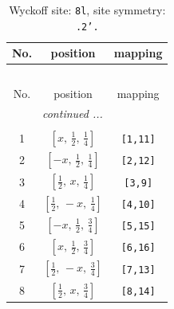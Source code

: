 \documentclass[fleqn,8pt]{jsarticle}
\begin{document}
\begin{longtable}{ccc}
\caption{Wyckoff site: {\tt 8l}, site symmetry: {\tt .2'.}}
 \\
 \hline \hline
No. & position & mapping \\ \hline \endfirsthead

\multicolumn{2}{l}{\tablename\ \thetable{}} \\
 \hline \hline
No. & position & mapping \\ \hline \endhead

 \hline \hline
\multicolumn{2}{r}{\footnotesize\it continued ...} \\ \endfoot

 \hline \hline
\multicolumn{2}{r}{} \\ \endlastfoot

1 & $\left[ x,\, \frac{1}{2},\, \frac{1}{4} \right]$ & {\tt [1,11]} \\ \hline
2 & $\left[ - x,\, \frac{1}{2},\, \frac{1}{4} \right]$ & {\tt [2,12]} \\ \hline
3 & $\left[ \frac{1}{2},\, x,\, \frac{1}{4} \right]$ & {\tt [3,9]} \\ \hline
4 & $\left[ \frac{1}{2},\, - x,\, \frac{1}{4} \right]$ & {\tt [4,10]} \\ \hline
5 & $\left[ - x,\, \frac{1}{2},\, \frac{3}{4} \right]$ & {\tt [5,15]} \\ \hline
6 & $\left[ x,\, \frac{1}{2},\, \frac{3}{4} \right]$ & {\tt [6,16]} \\ \hline
7 & $\left[ \frac{1}{2},\, - x,\, \frac{3}{4} \right]$ & {\tt [7,13]} \\ \hline
8 & $\left[ \frac{1}{2},\, x,\, \frac{3}{4} \right]$ & {\tt [8,14]} \\
\end{longtable}
\renewcommand{\arraystretch}{1.2}
\end{document}
